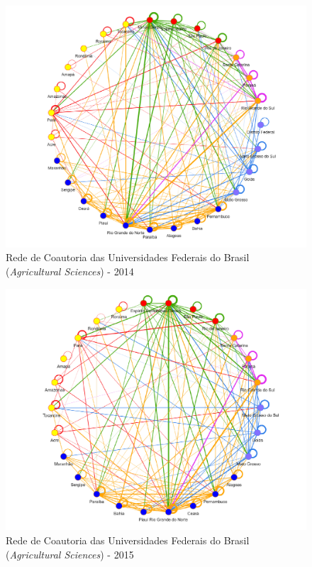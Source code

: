 \begin{figure}[H]
	\centering
	\includegraphics[width=\linewidth]{Imagens/rede-agr-br-2014.pdf}
	\caption{Rede de Coautoria das Universidades Federais do Brasil (\textit{Agricultural Sciences}) - 2014}
	\label{Rede de Coautoria - UF AGRI BR 2014}
\end{figure}


\begin{figure}[H]
	\centering
	\includegraphics[width=\linewidth]{Imagens/rede-agr-br-2015.pdf}
	\caption{Rede de Coautoria das Universidades Federais do Brasil (\textit{Agricultural Sciences}) - 2015}
	\label{Rede de Coautoria - UF AGRI BR 2015}
\end{figure}

